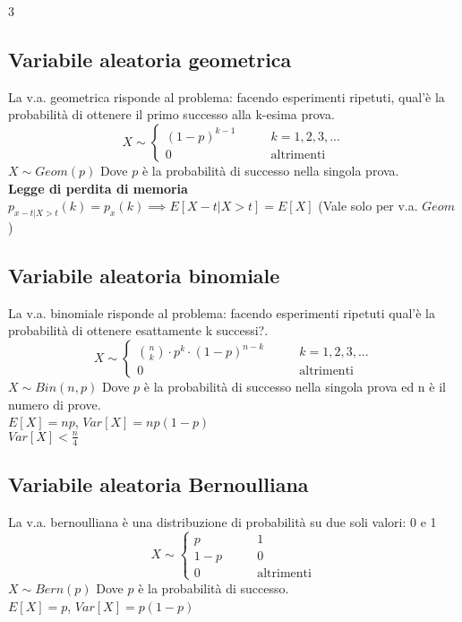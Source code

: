 \documentclass{article}
\begin{document}
\begin{multicols*}{3}
		\subsection{Variabile aleatoria geometrica}
		La v.a. geometrica risponde al problema: facendo esperimenti ripetuti, qual'è la probabilità di ottenere il primo successo alla k-esima prova.\\ 
		\begin{equation*}
			X \sim
			\left\{
				\begin{alignedat}{2}
					(1-p)^{k-1}  & \qquad k=1,2,3,...\\
					0            & \qquad \text{altrimenti}
				\end{alignedat}
			\right.
		\end{equation*}
		\(X \sim Geom(p)\) Dove \(p\) è la probabilità di successo nella singola prova.\\
		\textbf{Legge di perdita di memoria}\\
		\(p_{x-t|X>t}(k) = p_x (k) \implies E[X-t|X>t] = E[X]\) (Vale solo per v.a. \(Geom\))
		
		\subsection{Variabile aleatoria binomiale}
		La v.a. binomiale risponde al problema: facendo esperimenti ripetuti qual'è la probabilità di ottenere esattamente k successi?.\\ 
		\begin{equation*}
			X \sim
			\left\{
			\begin{alignedat}{2}
				\binom{n}{k}\cdot p^k \cdot (1-p)^{n-k}  & \qquad k=1,2,3,...\\
				0            & \qquad \text{altrimenti}
			\end{alignedat}
			\right.
		\end{equation*}
		\(X \sim Bin(n,p)\) Dove \(p\) è la probabilità di successo nella singola prova ed n è il numero di prove.\\
		\(E[X] = np\), \(Var[X] = np(1-p)\)\\
		\(Var[X]< \frac{n}{4}\)
		
		\subsection{Variabile aleatoria Bernoulliana}
		La v.a. bernoulliana è una distribuzione di probabilità su due soli valori: 0 e 1\\ 
		\begin{equation*}
			X \sim
			\left\{
			\begin{alignedat}{2}
				p  & \qquad 1\\
				1-p  & \qquad 0\\
				0            & \qquad \text{altrimenti}
			\end{alignedat}
			\right.
		\end{equation*}
		\(X \sim Bern(p)\) Dove \(p\) è la probabilità di successo.\\
		\(E[X] = p\), \(Var[X] = p(1-p)\)
		

\end{multicols*}
\end{document}
